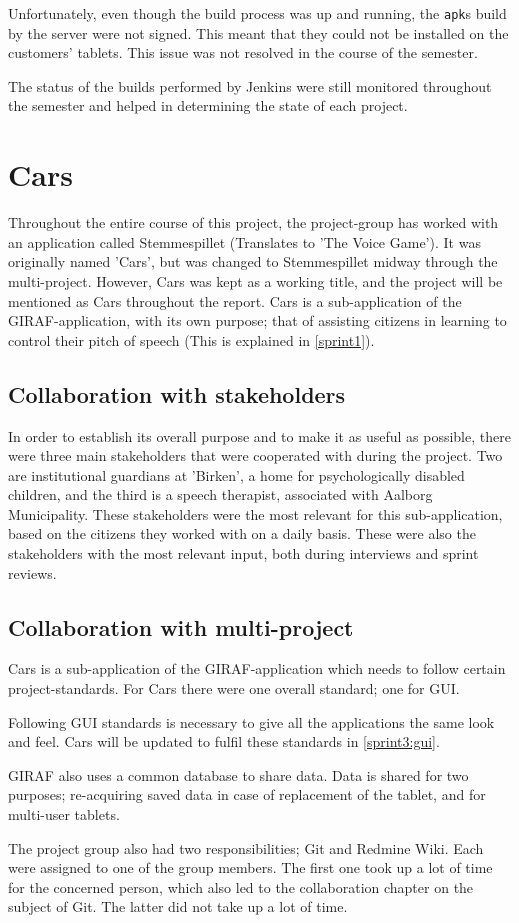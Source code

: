 Unfortunately, even though the build process was up and running, the \texttt{apk}s build by the server were not signed.
This meant that they could not be installed on the customers' tablets.
This issue was not resolved in the course of the semester.

The status of the builds performed by Jenkins were still monitored throughout the semester and helped in determining the state of each project.

\section{Cars}
Throughout the entire course of this project, the project-group has worked with an application called Stemmespillet (Translates to 'The Voice Game').
It was originally named 'Cars', but was changed to Stemmespillet midway through the multi-project.
However, Cars was kept as a working title, and the project will be mentioned as Cars throughout the report.
Cars is a sub-application of the GIRAF-application, with its own purpose; that of assisting citizens in learning to control their pitch of speech (This is explained in \cref{sprint1}).

\subsection{Collaboration with stakeholders}
In order to establish its overall purpose and to make it as useful as possible, there were three main stakeholders that were cooperated with during the project.
Two are institutional guardians at 'Birken', a home for psychologically disabled children, and the third is a speech therapist, associated with Aalborg Municipality.
These stakeholders were the most relevant for this sub-application, based on the citizens they worked with on a daily basis.
These were also the stakeholders with the most relevant input, both during interviews and sprint reviews.

\subsection{Collaboration with multi-project}
Cars is a sub-application of the GIRAF-application which needs to follow certain project-standards.
For Cars there were one overall standard; one for GUI.

Following GUI standards is necessary to give all the applications the same look and feel.
Cars will be updated to fulfil these standards in \cref{sprint3:gui}.

GIRAF also uses a common database to share data.
Data is shared for two purposes; re-acquiring saved data in case of replacement of the tablet, and for multi-user tablets.

The project group also had two responsibilities; Git and Redmine Wiki.
Each were assigned to one of the group members.
The first one took up a lot of time for the concerned person, which also led to the collaboration chapter on the subject of Git.
The latter did not take up a lot of time.

